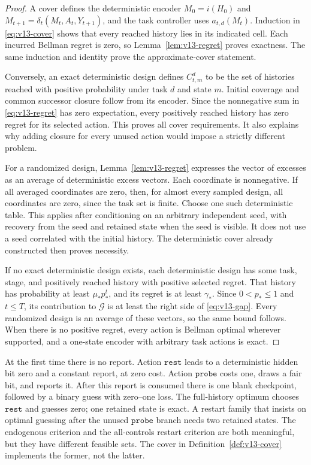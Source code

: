 \begin{proof}
A cover defines the deterministic encoder $M_0=i(H_0)$ and
$M_{t+1}=\delta_t(M_t,A_t,Y_{t+1})$, and the task controller uses
$a_{t,d}(M_t)$. Induction in \eqref{eq:v13-cover} shows that every reached
history lies in its indicated cell. Each incurred Bellman regret is
zero, so Lemma~\ref{lem:v13-regret} proves exactness. The same induction
and identity prove the approximate-cover statement.

Conversely, an exact deterministic design defines $C_{t,m}^d$ to be the
set of histories reached with positive probability under task $d$ and
state $m$. Initial coverage and common successor closure follow from
its encoder. Since the nonnegative sum in \eqref{eq:v13-regret} has
zero expectation, every positively reached history has zero regret
for its selected action. This proves all cover requirements. It also
explains why adding closure for every unused action would impose a
strictly different problem.

For a randomized design, Lemma~\ref{lem:v13-regret} expresses the vector
of excesses as an average of deterministic excess vectors. Each
coordinate is nonnegative. If all averaged coordinates are zero, then,
for almost every sampled design, all coordinates are zero, since the
task set is finite. Choose one such deterministic table. This applies
after conditioning on an arbitrary independent seed, with recovery
from the seed and retained state when the seed is visible. It does not
use a seed correlated with the initial history. The deterministic
cover already constructed then proves necessity.

If no exact deterministic design exists, each deterministic design has
some task, stage, and positively reached history with positive selected
regret. That history has probability at least $\mu_*p_*^t$, and its
regret is at least $\gamma_*$. Since $0<p_*\le1$ and $t\le T$, its
contribution to $\mathcal G$ is at least the right side of
\eqref{eq:v13-gap}. Every randomized design is an average of these
vectors, so the same bound follows. When there is no positive regret,
every action is Bellman optimal wherever supported, and a one-state
encoder with arbitrary task actions is exact.
\end{proof}

\begin{example}
At the first time there is no report. Action $\mathtt{rest}$ leads to
a deterministic hidden bit zero and a constant report, at zero cost.
Action $\mathtt{probe}$ costs one, draws a fair bit, and reports it.
After this report is consumed there is one blank checkpoint, followed
by a binary guess with zero--one loss. The full-history optimum chooses
$\mathtt{rest}$ and guesses zero; one retained state is exact. A restart
family that insists on optimal guessing after the unused
$\mathtt{probe}$ branch needs two retained states. The endogenous
criterion and the all-controls restart criterion are both meaningful,
but they have different feasible sets. The cover in
Definition~\ref{def:v13-cover} implements the former, not the latter.
\end{example}

